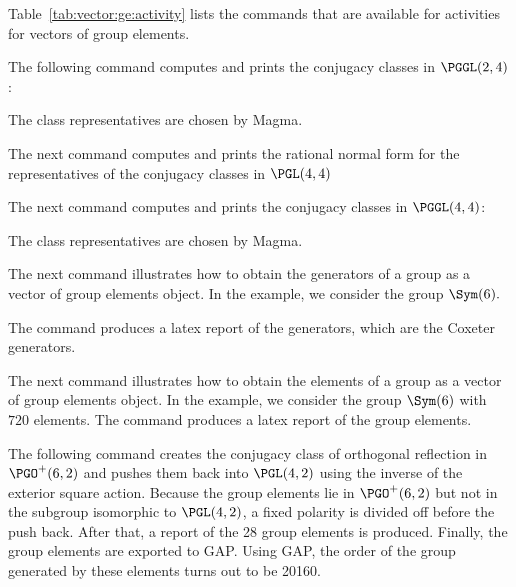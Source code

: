 Table~\ref{tab:vector:ge:activity} lists the commands that are available for activities for vectors of group elements.


\bigskip

The following command computes and prints the conjugacy classes in $\PGGL(2,4)$:


The class representatives are chosen by Magma.

\bigskip



\bigskip

The next command computes and prints 
the rational normal form for the representatives of the conjugacy classes in $\PGL(4,4)$


\bigskip




The next command computes and prints 
the conjugacy classes in $\PGGL(4,4)$:


The class representatives are chosen by Magma.

\bigskip






The next command illustrates how to obtain the generators of a group as a vector of group elements object. 
In the example, we consider the group $\Sym(6).$ 


\bigskip


The command produces a latex report of the generators, which are the Coxeter generators.



\bigskip


The next command illustrates how to obtain 
the elements of a group as a vector of group elements object. 
In the example, we consider the group 
$\Sym(6)$ with $720$ elements. 
The command produces a latex report of the group elements.


\bigskip



The following command creates the conjugacy 
class of orthogonal reflection in $\PGO^+(6,2)$ and 
pushes them back into $\PGL(4,2)$ using the inverse of the exterior square action.
Because the group elements lie in $\PGO^+(6,2)$ but not 
in the subgroup isomorphic to $\PGL(4,2)$, 
a fixed polarity is divided off before the push back.
After that, a report of the 28 group elements is produced. 
Finally, the group elements are exported to GAP.
Using GAP, the order of the group generated 
by these elements turns out to be 20160.

